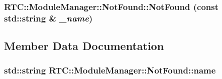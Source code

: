 \subsubsection[{NotFound}]{\setlength{\rightskip}{0pt plus 5cm}RTC::ModuleManager::NotFound::NotFound (const std::string \& {\em \_\-name})\hspace{0.3cm}{\ttfamily  [inline]}}\label{structRTC_1_1ModuleManager_1_1NotFound_a70e1590e2ecdedf83a59766290d47650}


\subsection{Member Data Documentation}
\subsubsection[{name}]{\setlength{\rightskip}{0pt plus 5cm}std::string {\bf RTC::ModuleManager::NotFound::name}}\label{structRTC_1_1ModuleManager_1_1NotFound_a6c1e71e3585e7fe3aa7a3f6905454944}
